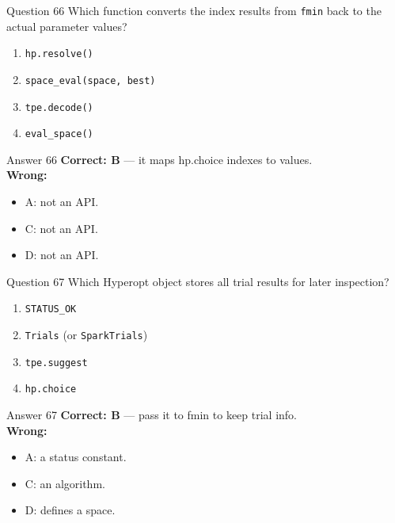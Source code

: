 \documentclass[aspectratio=169,11pt]{beamer}
\begin{document}
\begin{frame}{Question 66}
Which function converts the index results from \texttt{fmin} back to the actual parameter values?
\begin{enumerate}[label=\Alph*.]
\item \texttt{hp.resolve()}
\item \texttt{space\_eval(space, best)}
\item \texttt{tpe.decode()}
\item \texttt{eval\_space()}
\end{enumerate}
\end{frame}
\begin{frame}{Answer 66}
\textbf{Correct: B} --- it maps hp.choice indexes to values.\\
\vspace{0.5em}
\textbf{Wrong:}
\begin{itemize}
\item A: not an API.
\item C: not an API.
\item D: not an API.
\end{itemize}
\end{frame}

\begin{frame}{Question 67}
Which Hyperopt object stores all trial results for later inspection?
\begin{enumerate}[label=\Alph*.]
\item \texttt{STATUS\_OK}
\item \texttt{Trials} (or \texttt{SparkTrials})
\item \texttt{tpe.suggest}
\item \texttt{hp.choice}
\end{enumerate}
\end{frame}
\begin{frame}{Answer 67}
\textbf{Correct: B} --- pass it to fmin to keep trial info.\\
\vspace{0.5em}
\textbf{Wrong:}
\begin{itemize}
\item A: a status constant.
\item C: an algorithm.
\item D: defines a space.
\end{itemize}
\end{frame}
\end{document}
